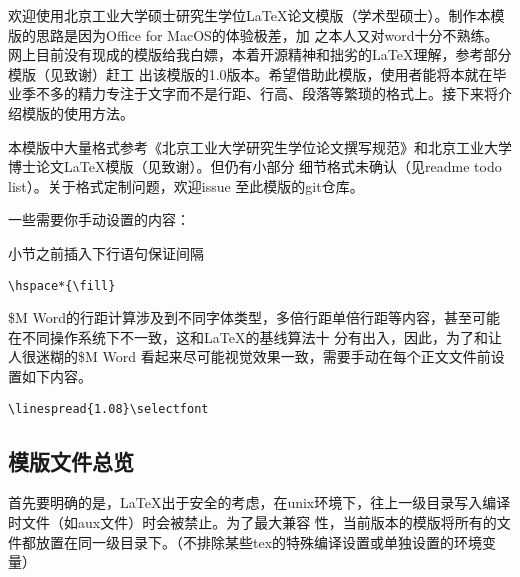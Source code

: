 \label{chap:intro}
\linespread{1}\selectfont

欢迎使用北京工业大学硕士研究生学位\LaTeX 论文模版（学术型硕士）。制作本模版的思路是因为Office for MacOS的体验极差，加
之本人又对word十分不熟练。网上目前没有现成的模版给我白嫖，本着开源精神和拙劣的\LaTeX 理解，参考部分模版（见致谢）赶工
出该模版的1.0版本。希望借助此模版，使用者能将本就在毕业季不多的精力专注于文字而不是行距、行高、段落等繁琐的格式上。接下来将介绍模版的使用方法。

本模版中大量格式参考《北京工业大学研究生学位论文撰写规范》和北京工业大学博士论文\LaTeX 模版（见致谢）。但仍有小部分
细节格式未确认（见readme todo list）。关于格式定制问题，欢迎issue 至此模版的git仓库。

一些需要你手动设置的内容：

小节之前插入下行语句保证间隔
\begin{center}
  \begin{minipage}{0.5\textwidth}
    \begin{Verbatim}[frame=single]
    \hspace*{\fill}
    \end{Verbatim}
  \end{minipage}
\end{center}

\$M Word的行距计算涉及到不同字体类型，多倍行距单倍行距等内容，甚至可能在不同操作系统下不一致，这和\LaTeX 的基线算法十
分有出入，因此，为了和让人很迷糊的\$M Word 看起来尽可能视觉效果一致，需要手动在每个正文文件前设置如下内容。

\begin{center}
  \begin{minipage}{0.5\textwidth}
    \begin{Verbatim}[frame=single]
\linespread{1.08}\selectfont
    \end{Verbatim}
  \end{minipage}
\end{center}


\hspace*{\fill}

\label{sec:fst}
\subsection{模版文件总览}
首先要明确的是，\LaTeX 出于安全的考虑，在unix环境下，往上一级目录写入编译时文件（如aux文件）时会被禁止。为了最大兼容
性，当前版本的模版将所有的文件都放置在同一级目录下。（不排除某些tex的特殊编译设置或单独设置的环境变量）

